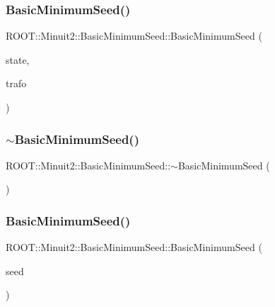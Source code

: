 \subsubsection{\texorpdfstring{BasicMinimumSeed()}{BasicMinimumSeed()}\hspace{0.1cm}{\footnotesize\ttfamily [3/6]}}
{\footnotesize\ttfamily R\+O\+O\+T\+::\+Minuit2\+::\+Basic\+Minimum\+Seed\+::\+Basic\+Minimum\+Seed (\begin{DoxyParamCaption}\item[{const \mbox{\hyperlink{classROOT_1_1Minuit2_1_1MinimumState}{Minimum\+State}} \&}]{state,  }\item[{const \mbox{\hyperlink{classROOT_1_1Minuit2_1_1MnUserTransformation}{Mn\+User\+Transformation}} \&}]{trafo }\end{DoxyParamCaption})\hspace{0.3cm}{\ttfamily [inline]}}

\mbox{\label{classROOT_1_1Minuit2_1_1BasicMinimumSeed_ab0106865fff141f6f402cc934ea292d7}} 
\subsubsection{\texorpdfstring{$\sim$BasicMinimumSeed()}{~BasicMinimumSeed()}\hspace{0.1cm}{\footnotesize\ttfamily [2/3]}}
{\footnotesize\ttfamily R\+O\+O\+T\+::\+Minuit2\+::\+Basic\+Minimum\+Seed\+::$\sim$\+Basic\+Minimum\+Seed (\begin{DoxyParamCaption}{ }\end{DoxyParamCaption})\hspace{0.3cm}{\ttfamily [inline]}}

\mbox{\label{classROOT_1_1Minuit2_1_1BasicMinimumSeed_a9bd68bcfd30880f67566bfd4f70a2ca6}} 
\subsubsection{\texorpdfstring{BasicMinimumSeed()}{BasicMinimumSeed()}\hspace{0.1cm}{\footnotesize\ttfamily [4/6]}}
{\footnotesize\ttfamily R\+O\+O\+T\+::\+Minuit2\+::\+Basic\+Minimum\+Seed\+::\+Basic\+Minimum\+Seed (\begin{DoxyParamCaption}\item[{const \mbox{\hyperlink{classROOT_1_1Minuit2_1_1BasicMinimumSeed}{Basic\+Minimum\+Seed}} \&}]{seed }\end{DoxyParamCaption})\hspace{0.3cm}{\ttfamily [inline]}}

